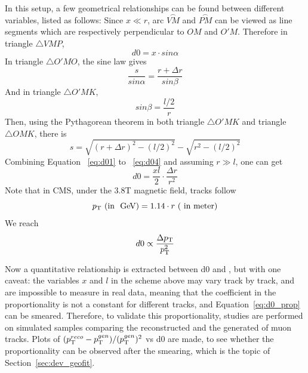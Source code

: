 In this setup, a few geometrical relationships can be found between different variables, listed as follows:
Since $x \ll r$, arc $\stackrel{\frown}{VM}$ and $\stackrel{\frown}{PM}$ can be viewed as line segments which are respectively perpendicular to $OM$ and $O'M$.
Therefore in triangle $\triangle VMP$, 
\begin{equation}\label{eq:d01}
      d0 = x \cdot sin\alpha
\end{equation}      
In triangle $\triangle O'MO$, the sine law gives
\begin{equation}\label{eq:d02}
      \frac{s}{sin\alpha} = \frac{r+\Delta{}r}{sin\beta}
\end{equation}
And in triangle $\triangle O'MK$, 
\begin{equation}\label{eq:d03}
      sin\beta = \frac{l/2}{r}
\end{equation}   
Then, using the Pythagorean theorem in both triangle $\triangle O'MK$ and triangle $\triangle OMK$, there is
\begin{equation}\label{eq:d04}
      s =  \sqrt{(r+\Delta{}r)^{2} - (l/2)^{2}} - \sqrt{r^{2} - (l/2)^{2}}
\end{equation}   
Combining Equation ~\ref{eq:d01} to ~\ref{eq:d04} and assuming $r \gg l$, one can get
\begin{equation}\label{eq:d05}
      d0 = \frac{xl}{2} \cdot \frac{\Delta{}r}{r^{2}}
\end{equation}  
Note that in CMS, under the 3.8T magnetic field, tracks follow 
\begin{equation}
    p_{\mathrm{T}} ~(\text{in ~\ensuremath{\mbox{GeV}}}) = 1.14 \cdot r ~(~\text{in meter})   
\end{equation}
We reach
\begin{equation}\label{eq:d0_prop}
    d0 \propto \frac{\Delta{}p_{\mathrm{T}}}{p_{\mathrm{T}}^{2}}
\end{equation}

Now a quantitative relationship is extracted between d0 and \pt, but with one caveat:
the variables $x$ and $l$ in the scheme above may vary track by track, and are impossible to measure in real data,
meaning that the coefficient in the proportionality is not a constant for different tracks, and Equation~\ref{eq:d0_prop} can be smeared.
Therefore, to validate this proportionality, studies are performed on simulated samples comparing the reconstructed \pt and the generated \pt of muon tracks.
Plots of $(p_{\mathrm{T}}^{reco}-p_{\mathrm{T}}^{gen})/ (p_{\mathrm{T}}^{gen})^{2}$ vs d0 are made, 
to see whether the proportionality can be observed after the smearing,
which is the topic of Section~\ref{sec:dev_geofit}.

